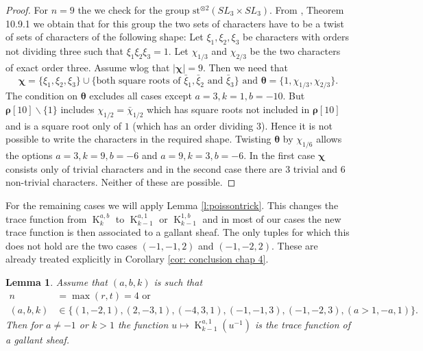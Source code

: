 \documentclass[12pt]{amsart}
\theoremstyle{plain}
\newtheorem{lem}[thm]{Lemma}
\theoremstyle{definition}
\theoremstyle{remark}
\numberwithin{equation}{section}
\DeclareMathOperator{\K}{K} %
\begin{document}
\begin{proof}
For $n=9$ the we check for the group $\mathrm{st}^{\otimes2}(SL_3\times SL_3)$. From \cite{Katzbook}, Theorem 10.9.1 we obtain that for this group the two sets of characters have to be a twist of sets of characters of the following shape: 
Let $\xi_1,\xi_2,\xi_3$ be characters with orders not dividing three such that $\xi_1\xi_2\xi_3=1$.
Let $\chi_{1/3}$ and $\chi_{2/3}$ be the two characters of exact order three. Assume wlog that $|\bm\chi|=9$. Then we need that 
$$\bm{\chi}=\{\xi_1,\xi_2,\xi_3\}\cup \{\text{both square roots of }\bar \xi_1,\bar \xi_2\text{ and }\bar \xi_3\}\text{ and } \bm\theta=\{1,\chi_{1/3},\chi_{2/3}\}.$$
The condition on $\bm \theta$ excludes all cases except $a=3,k=1,b=-10$. But $\bm \rho[10]\smallsetminus\{1\}$ includes $\chi_{1/2}=\bar\chi_{1/2}$ which has square roots not included in $\bm \rho[10]$ and is a square root only of $1$ (which has an order dividing 3). Hence it is not possible to write the characters in the required shape. Twisting $\bm{\theta}$ by $\chi_{1/6}$ allows the options $a=3,k=9,b=-6$ and $a=9,k=3,b=-6$. In the first case $\bm{\chi}$ consists only of trivial characters and in the second case there are 3 trivial and 6 non-trivial characters. Neither of these are possible. 

\end{proof}




For the remaining cases we will apply Lemma \ref{l:poissontrick}. This changes the trace function from $\K_k^{a,b}$ to $\K_{k-1}^{a,1}$ or $\K_{k-1}^{1,b}$ and in most of our cases the new trace function is then associated to a gallant sheaf. The only tuples for which this does not hold are the two cases $(-1,-1,2)$ and $(-1,-2,2)$. These are already treated explicitly in Corollary \ref{cor: conclusion chap 4}.

\begin{lem}\label{lem: special cases}
Assume that $(a,b,k)$ is such that 
\begin{align*}
    n&=\max (r,t)=  4\text{  or}\\
    (a,b,k)&\in \{(1,-2,1), (2,-3,1),(-4,3,1),(-1,-1,3),(-1,-2,3),(a>1,-a,1)\}.
\end{align*}
Then for $a\neq -1$ or $k>1$ the function $u\mapsto \K_{k-1}^{a,1}(u^{-1})$ is the trace function of a gallant sheaf. 

\end{lem}
\end{document}
